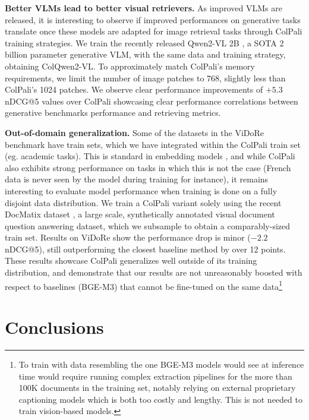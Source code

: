 \documentclass{article} %
\begin{document}
\noindent\textbf{Better VLMs lead to better visual retrievers.} As improved VLMs are released, it is interesting to observe if improved performances on generative tasks translate once these models are adapted for image retrieval tasks through ColPali training strategies. We train the recently released Qwen2-VL 2B \citep{wang2024qwen2vlenhancingvisionlanguagemodels}, a SOTA 2 billion parameter generative VLM, with the same data and training strategy, obtaining ColQwen2-VL. To approximately match ColPali's memory requirements, we limit the number of image patches to 768, slightly less than ColPali's 1024 patches. We observe clear performance improvements of $+5.3$ nDCG@5 values over ColPali showcasing clear performance correlations between generative benchmarks performance and retrieving metrics.

\noindent\textbf{Out-of-domain generalization.} Some of the datasets in the ViDoRe benchmark have train sets, which we have integrated within the ColPali train set (eg. academic tasks). This is standard in embedding models \citep{wang2024improvingtextembeddingslarge, lee2024nvembedimprovedtechniquestraining}, and while ColPali also exhibits strong performance on tasks in which this is not the case (French data is never seen by the model during training for instance), it remains interesting to evaluate model performance when training is done on a fully disjoint data distribution. We train a ColPali variant solely using the recent DocMatix dataset \citep{laurençon2024building}, a large scale, synthetically annotated visual document question answering dataset, which we subsample to obtain a comparably-sized train set. Results on ViDoRe show the performance drop is minor ($-2.2$ nDCG@5), still outperforming the closest baseline method by over 12 points. These results showcase
ColPali generalizes well outside of its training distribution, and demonstrate that our results are not unreasonably boosted with respect to baselines (BGE-M3) that cannot be fine-tuned on the same data\footnote{To train with data resembling the one BGE-M3 models would see at inference time would require running complex extraction pipelines for the more than 100K documents in the training set, notably relying on external proprietary captioning models which is both too costly and lengthy. This is not needed to train vision-based models.} 

\section{Conclusions}
\label{section:conclusions_and_future_work}
\end{document}

